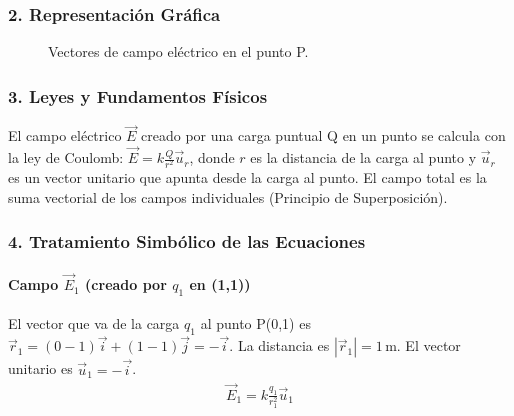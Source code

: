 \subsubsection*{2. Representación Gráfica}
\begin{figure}[H]
    \centering
    \caption{Vectores de campo eléctrico en el punto P.}
\end{figure}

\subsubsection*{3. Leyes y Fundamentos Físicos}
El campo eléctrico $\vec{E}$ creado por una carga puntual Q en un punto se calcula con la ley de Coulomb: $\vec{E} = k \frac{Q}{r^2}\vec{u}_r$, donde $r$ es la distancia de la carga al punto y $\vec{u}_r$ es un vector unitario que apunta desde la carga al punto. El campo total es la suma vectorial de los campos individuales (Principio de Superposición).

\subsubsection*{4. Tratamiento Simbólico de las Ecuaciones}
\paragraph*{Campo $\vec{E}_1$ (creado por $q_1$ en (1,1))}
El vector que va de la carga $q_1$ al punto P(0,1) es $\vec{r}_1 = (0-1)\vec{i} + (1-1)\vec{j} = -\vec{i}$.
La distancia es $|\vec{r}_1|=1\,\text{m}$. El vector unitario es $\vec{u}_1 = -\vec{i}$.
\begin{gather}
    \vec{E}_1 = k \frac{q_1}{r_1^2} \vec{u}_1
\end{gather}
